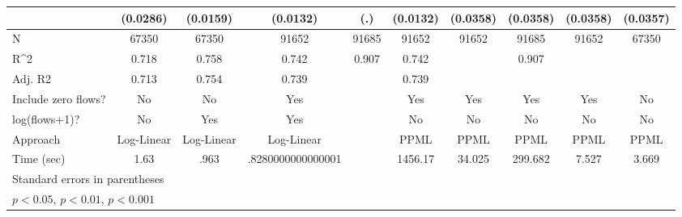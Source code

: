 \begin{table}[htbp]
\begin{tabular}{l*{9}{c}}
                    &    (0.0286)         &    (0.0159)         &    (0.0132)         &         (.)         &    (0.0132)         &    (0.0358)         &    (0.0358)         &    (0.0358)         &    (0.0357)         \\
\hline
N                   &       67350         &       67350         &       91652         &       91685         &       91652         &       91652         &       91685         &       91652         &       67350         \\
R^2                 &       0.718         &       0.758         &       0.742         &       0.907         &       0.742         &                     &       0.907         &                     &                     \\
Adj. R2             &       0.713         &       0.754         &       0.739         &                     &       0.739         &                     &                     &                     &                     \\
Include zero flows? &          No         &          No         &         Yes         &                     &         Yes         &         Yes         &         Yes         &         Yes         &          No         \\
log(flows+1)?       &          No         &         Yes         &         Yes         &                     &          No         &          No         &          No         &          No         &          No         \\
Approach            &  Log-Linear         &  Log-Linear         &  Log-Linear         &                     &        PPML         &        PPML         &        PPML         &        PPML         &        PPML         \\
Time (sec)          &        1.63         &        .963         &.8280000000000001         &                     &     1456.17         &      34.025         &     299.682         &       7.527         &       3.669         \\
\hline\hline
\multicolumn{10}{l}{\footnotesize Standard errors in parentheses}\\
\multicolumn{10}{l}{\footnotesize \sym{*} \(p<0.05\), \sym{**} \(p<0.01\), \sym{***} \(p<0.001\)}\\
\end{tabular}
\end{table}
